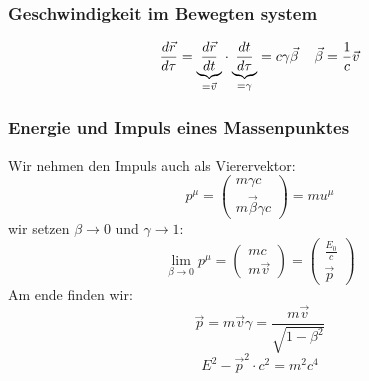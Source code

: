 \documentclass{article}
\newcommand{\mspc}{\hspace{0.4cm}}
\begin{document}
\subsubsection*{Geschwindigkeit im Bewegten system}
\[\frac{d\vec{r}}{d\tau}=\underset{=\vec{v}}{\underbrace{\frac{d\vec{r}}{dt}}}\cdot\underset{=\gamma}{\underbrace{\frac{dt}{d\tau}}}=c\gamma\vec{\beta}\mspc\vec{\beta}=\frac{1}{c}\vec{v}\]
\subsubsection*{Energie und Impuls eines Massenpunktes}Wir nehmen den Impuls auch als Vierervektor:\[p^\mu=\begin{pmatrix}m\gamma c\\m\vec{\beta}\gamma c\end{pmatrix}=m u^\mu\]
wir setzen $\beta\rightarrow0$ und $\gamma\rightarrow 1$:\[\lim_{\beta\rightarrow0}p^\mu=\begin{pmatrix}mc\\m\vec{v}\end{pmatrix}=\begin{pmatrix}\frac{E_0}{c}\\\vec{p}\end{pmatrix}\]
Am ende finden wir:\[\vec{p}=m\vec{v}\gamma=\frac{m\vec{v}}{\sqrt{1-\beta^2}}\]
\[E^2-\vec{p}^2\cdot c^2=m^2c^4\]
\end{document}

